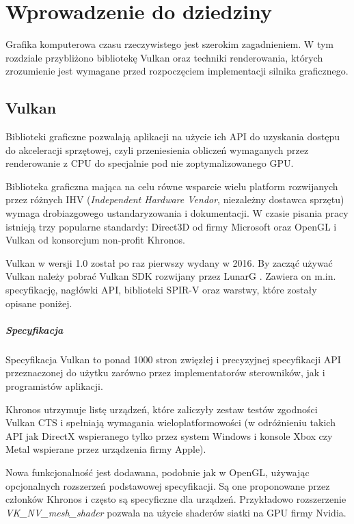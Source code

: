 \chapter{Wprowadzenie do dziedziny}
\label{chap:field}

Grafika komputerowa czasu rzeczywistego jest szerokim zagadnieniem.
W tym rozdziale przybliżono bibliotekę Vulkan oraz techniki renderowania, których zrozumienie jest wymagane przed rozpoczęciem implementacji silnika graficznego.

\section{Vulkan}

Biblioteki graficzne pozwalają aplikacji na użycie ich API do uzyskania dostępu do akceleracji sprzętowej, czyli przeniesienia obliczeń wymaganych przez renderowanie z CPU do specjalnie pod nie zoptymalizowanego GPU.

Biblioteka graficzna mająca na celu równe wsparcie wielu platform rozwijanych przez różnych IHV (\textit{Independent Hardware Vendor}, niezależny dostawca sprzętu) wymaga drobiazgowego ustandaryzowania i dokumentacji.
W czasie pisania pracy istnieją trzy popularne standardy: Direct3D od firmy Microsoft oraz OpenGL i Vulkan od konsorcjum non-profit Khronos.

Vulkan w wersji 1.0 został po raz pierwszy wydany w 2016. By zacząć używać Vulkan należy pobrać Vulkan SDK rozwijany przez LunarG \cite{VULKANSDK}.
Zawiera on m.in. specyfikację, nagłówki API, biblioteki SPIR-V oraz warstwy, które zostały opisane poniżej.

\paragraph{Specyfikacja}

Specyfikacja Vulkan \cite{VULKANSPEC} to ponad 1000 stron zwięzłej i precyzyjnej specyfikacji API przeznaczonej do użytku zarówno przez implementatorów sterowników, jak i programistów aplikacji.

Khronos utrzymuje listę urządzeń, które zaliczyły zestaw testów zgodności Vulkan CTS \cite{VULKANCTS} i spełniają wymagania wieloplatformowości (w odróżnieniu takich API jak DirectX wspieranego tylko przez system Windows i konsole Xbox \cite{HughesDamEtAl13} czy Metal wspierane przez urządzenia firmy Apple).

Nowa funkcjonalność jest dodawana, podobnie jak w OpenGL, używając opcjonalnych rozszerzeń podstawowej specyfikacji. Są one proponowane przez członków Khronos i często są specyficzne dla urządzeń.
Przykładowo rozszerzenie \textit{VK\_NV\_mesh\_shader} pozwala na użycie shaderów siatki na GPU firmy Nvidia.

